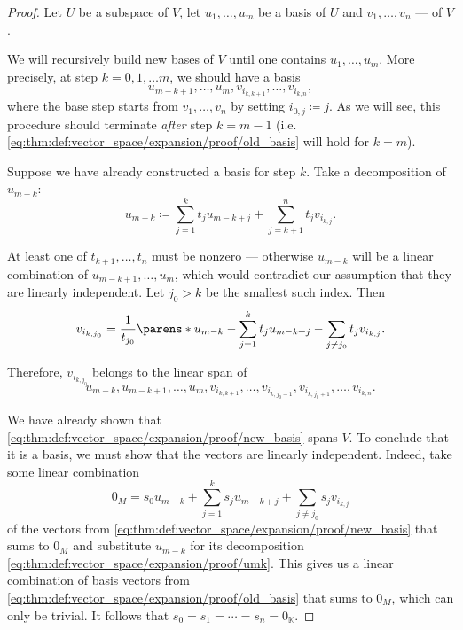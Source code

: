 \begin{proof}
   Let \( U \) be a subspace of \( V \), let \( u_1, \ldots, u_m \) be a basis of \( U \) and \( v_1, \ldots, v_n \) --- of \( V \).

  We will recursively build new bases of \( V \) until one contains \( u_1, \ldots, u_m \). More precisely, at step \( k = 0, 1, \ldots m\), we should have a basis
  \begin{equation}\label{eq:thm:def:vector_space/expansion/proof/old_basis}
    u_{m-k+1}, \ldots, u_m, v_{i_{k,k+1}}, \ldots, v_{i_{k,n}},
  \end{equation}
  where the base step starts from \( v_1, \ldots, v_n \) by setting \( i_{0,j} \coloneqq j \). As we will see, this procedure should terminate \emph{after} step \( k = m - 1 \) (i.e. \eqref{eq:thm:def:vector_space/expansion/proof/old_basis} will hold for \( k = m \)).

  Suppose we have already constructed a basis for step \( k \). Take a decomposition of \( u_{m-k} \):
  \begin{equation}\label{eq:thm:def:vector_space/expansion/proof/umk}
    u_{m-k} \coloneqq \sum_{j=1}^k t_j u_{m-k+j} + \sum_{j=k+1}^n t_j v_{i_{k,j}}.
  \end{equation}

  At least one of \( t_{k+1}, \ldots, t_n \) must be nonzero --- otherwise \( u_{m-k} \) will be a linear combination of \( u_{m-k+1}, \ldots, u_m \), which would contradict our assumption that they are linearly independent. Let \( j_0 > k \) be the smallest such index. Then
  \begin{equation*}
    v_{i_{k,j_0}} = \frac 1 {t_{j_0}} \parens*{ u_{m-k} - \sum_{j=1}^k t_j u_{m-k+j} - \sum_{j \neq j_0} t_j v_{i_{k,j}} }.
  \end{equation*}

  Therefore, \( v_{i_{k,j_0}} \) belongs to the linear span of
  \begin{equation}\label{eq:thm:def:vector_space/expansion/proof/new_basis}
    u_{m-k}, u_{m-k+1}, \ldots, u_m, v_{i_{k,k+1}}, \ldots, v_{i_{k,j_0-1}}, v_{i_{k,j_0+1}}, \ldots, v_{i_{k,n}}.
  \end{equation}

  We have already shown that \eqref{eq:thm:def:vector_space/expansion/proof/new_basis} spans \( V \). To conclude that it is a basis, we must show that the vectors are linearly independent. Indeed, take some linear combination
  \begin{equation*}
    0_M = s_0 u_{m-k} + \sum_{j=1}^k s_j u_{m-k+j} + \sum_{j \neq j_0} s_j v_{i_{k,j}}
  \end{equation*}
  of the vectors from \eqref{eq:thm:def:vector_space/expansion/proof/new_basis} that sums to \( 0_M \) and substitute \( u_{m-k} \) for its decomposition \eqref{eq:thm:def:vector_space/expansion/proof/umk}. This gives us a linear combination of basis vectors from \eqref{eq:thm:def:vector_space/expansion/proof/old_basis} that sums to \( 0_M \), which can only be trivial. It follows that \( s_0 = s_1 = \cdots = s_n = 0_\BbbK \).


\end{proof}
